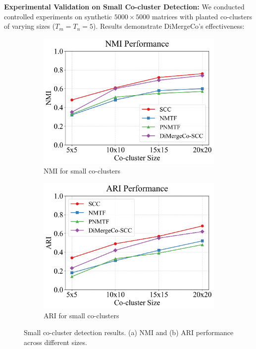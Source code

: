 \documentclass{ar2rc}
\begin{document}
\textbf{Experimental Validation on Small Co-cluster Detection:} We conducted controlled experiments on synthetic $5000 \times 5000$ matrices with planted co-clusters of varying sizes ($T_m = T_n = 5$). Results demonstrate DiMergeCo's effectiveness:

\begin{figure}[t]
  \centering
  \begin{subfigure}[b]{0.48\textwidth}
    \centering
    \includegraphics[width=\linewidth]{images/nmi_small.png}
    \caption{NMI for small co-clusters}
    \label{fig:nmi_small}
  \end{subfigure}
  \hfill
  \begin{subfigure}[b]{0.48\textwidth}
    \centering
    \includegraphics[width=\linewidth]{images/ari_small.png}
    \caption{ARI for small co-clusters}
    \label{fig:ari_small}
  \end{subfigure}
  \caption{Small co-cluster detection results. (a) NMI and (b) ARI performance across different sizes.}
  \label{fig:small-co-cluster-detection}
\end{figure}
\end{document}

